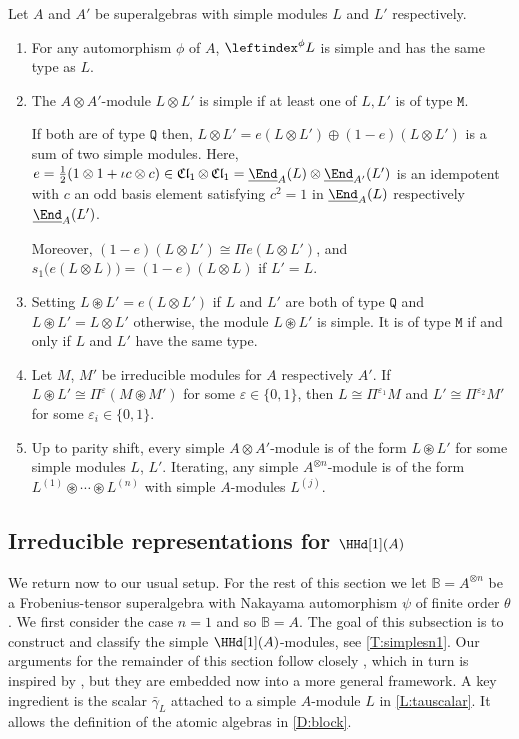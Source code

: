 \documentclass[a4paper,11pt]{amsart}
\newcommand{\uEnd}{\underline{\End}}
\numberwithin{equation}{subsection}
\theoremstyle{definition}
\theoremstyle{theorem}
\theoremstyle{remark}
\DeclareMathOperator\Cl{\mathfrak{Cl}}
\newcommand{\Bo}{\mathbb{B}}
\begin{document}
\begin{Lemma}\label{types}
Let $A$  and $A'$ be superalgebras with  simple modules $L$ and $L'$  respectively.
  \begin{enumerate}
    \item\label{typesa} For any automorphism $\phi$ of $A$, $\leftindex^{\phi}L$ is simple and has the same type as $L$.
    \item\label{typesb} The $A\otimes A'$-module $L\otimes L'$ is simple if at least one
      of $L,L'$ is of type $\mathtt M$.

      \noindent If both are of type $\mathtt Q$
      then,   $L\otimes L'=e(L\otimes L')\oplus(1-e)(L\otimes L')$ is a sum of two
      simple modules. Here, $e=\frac12(1\otimes1+\iota c\otimes c)\in \Cl_1\otimes \Cl_1=\uEnd_A(L)\otimes \uEnd_{A'}(L')$  is an idempotent with $c$ an odd  basis element satisfying $c^2=1$ in $\uEnd_A(L)$ respectively $\uEnd_A(L')$.

    \noindent  Moreover, $(1-e)(L\otimes L')\cong\Pi e(L\otimes L')$, and
      $s_1\bigl(e(L\otimes L)\bigr)=(1-e)(L\otimes L)$ if $L'=L$.
    \item\label{typesc} Setting $L\circledast L'=e(L\otimes L')$ if $L$ and $L'$ are
      both of type $\mathtt Q$ and $L\circledast L'=L\otimes L'$
      otherwise, the module $L\circledast L'$ is simple. It is of type
      $\mathtt M$ if and only if $L$ and $L'$ have the same type.
      \item\label{typesd} Let $M$, $M'$ be irreducible modules for $A$ respectively $A'$. If
      $L\circledast L'\cong \Pi^\varepsilon(M\circledast M')$ for some $\varepsilon\in\{0,1\}$, then
       $L\cong\Pi^{\varepsilon_1}M$ and
$L'\cong\Pi^{\varepsilon_2}M'$ for some $\varepsilon_i\in\{0,1\}$.
   \item\label{typese} Up to parity shift, every simple $A\otimes
      A'$-module is of the form $L\circledast L'$ for some simple modules $L$, $L'$.
      Iterating, any simple $A^{\otimes n}$-module is of the form
      $L^{(1)}\circledast\cdots\circledast L^{(n)}$ with simple $A$-modules
      $L^{(j)}$.
  \end{enumerate}
\end{Lemma}



\subsection{Irreducible representations for $\HHd[1](A)$}
We return now to our usual setup. For the rest of this section we let $\Bo=A^{\otimes n}$ be a Frobenius-tensor
superalgebra with Nakayama automorphism $\psi$ of finite order $\theta$. We first consider the case $n=1$ and so $\Bo=A$. The goal of this subsection is to construct and classify the simple $\HHd[1](A)$-modules,
see \autoref{T:simplesn1}. Our arguments for the remainder of this section follow closely
\cite[\S5]{Savage:AffineWreath}, which in turn is inspired by \cite{WanWang}, but they are
embedded now into a more general framework. A key ingredient is the scalar $\bar\gamma_L$
attached to a simple $A$-module $L$ in \autoref{L:tauscalar}. It allows the definition of
the atomic algebras in \autoref{D:block}.
\end{document}

